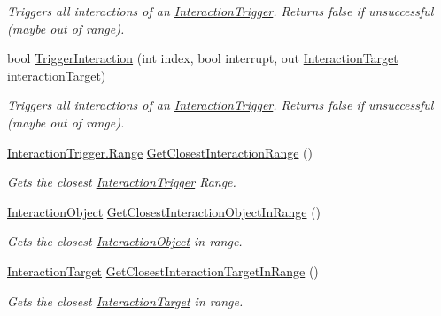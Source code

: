 \begin{DoxyCompactItemize}
\begin{DoxyCompactList}\small\item\em Triggers all interactions of an \mbox{\hyperlink{class_root_motion_1_1_final_i_k_1_1_interaction_trigger}{Interaction\+Trigger}}. Returns false if unsuccessful (maybe out of range). \end{DoxyCompactList}\item 
bool \mbox{\hyperlink{class_root_motion_1_1_final_i_k_1_1_interaction_system_a023deebcd1507232c8d4c8c365bb3c4f}{Trigger\+Interaction}} (int index, bool interrupt, out \mbox{\hyperlink{class_root_motion_1_1_final_i_k_1_1_interaction_target}{Interaction\+Target}} interaction\+Target)
\begin{DoxyCompactList}\small\item\em Triggers all interactions of an \mbox{\hyperlink{class_root_motion_1_1_final_i_k_1_1_interaction_trigger}{Interaction\+Trigger}}. Returns false if unsuccessful (maybe out of range). \end{DoxyCompactList}\item 
\mbox{\hyperlink{class_root_motion_1_1_final_i_k_1_1_interaction_trigger_1_1_range}{Interaction\+Trigger.\+Range}} \mbox{\hyperlink{class_root_motion_1_1_final_i_k_1_1_interaction_system_ac54c2cb302491c4bb1901354ae20022b}{Get\+Closest\+Interaction\+Range}} ()
\begin{DoxyCompactList}\small\item\em Gets the closest \mbox{\hyperlink{class_root_motion_1_1_final_i_k_1_1_interaction_trigger}{Interaction\+Trigger}} Range. \end{DoxyCompactList}\item 
\mbox{\hyperlink{class_root_motion_1_1_final_i_k_1_1_interaction_object}{Interaction\+Object}} \mbox{\hyperlink{class_root_motion_1_1_final_i_k_1_1_interaction_system_a8e9b8dd9898efbd21df01b9b815de2b0}{Get\+Closest\+Interaction\+Object\+In\+Range}} ()
\begin{DoxyCompactList}\small\item\em Gets the closest \mbox{\hyperlink{class_root_motion_1_1_final_i_k_1_1_interaction_object}{Interaction\+Object}} in range. \end{DoxyCompactList}\item 
\mbox{\hyperlink{class_root_motion_1_1_final_i_k_1_1_interaction_target}{Interaction\+Target}} \mbox{\hyperlink{class_root_motion_1_1_final_i_k_1_1_interaction_system_a8de7dba4c5de727e21faa9ed94b2516a}{Get\+Closest\+Interaction\+Target\+In\+Range}} ()
\begin{DoxyCompactList}\small\item\em Gets the closest \mbox{\hyperlink{class_root_motion_1_1_final_i_k_1_1_interaction_target}{Interaction\+Target}} in range. \end{DoxyCompactList}\item 

\end{DoxyCompactItemize}
